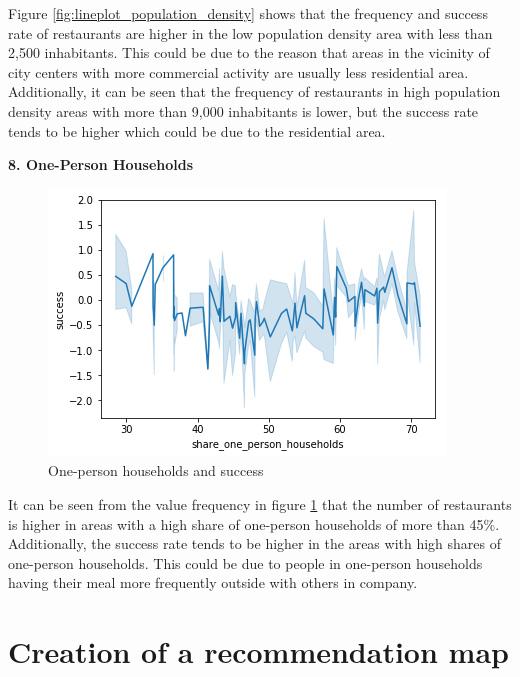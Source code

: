 \documentclass[a4paper, 11pt, oneside]{Thesis}  %
\begin{document}
Figure \ref{fig:lineplot_population_density} shows that the frequency and success rate of restaurants are higher in the low population density area with less than 2,500 inhabitants. This could be due to the reason that areas in the vicinity of city centers with more commercial activity are usually less residential area. Additionally, it can be seen that the frequency of restaurants in high population density areas with more than 9,000 inhabitants is lower, but the success rate tends to be higher which could be due to the residential area.

\textbf{8.	One-Person Households}
 
\begin{figure}[h]
\includegraphics[scale=0.7]{Figures/Exploratory/lineplot_one_person_households.png}
\centering
\caption{One-person households and success}
\label{fig:lineplot_one_person_households}
\end{figure}

It can be seen from the value frequency in figure \ref{fig:lineplot_one_person_households} that the number of restaurants is higher in areas with a high share of one-person households of more than 45\%. Additionally, the success rate tends to be higher in the areas with high shares of one-person households. This could be due to people in one-person households having their meal more frequently outside with others in company.

\section{Creation of a recommendation map}
\label{creation_of_recommendation_map}
\end{document}
